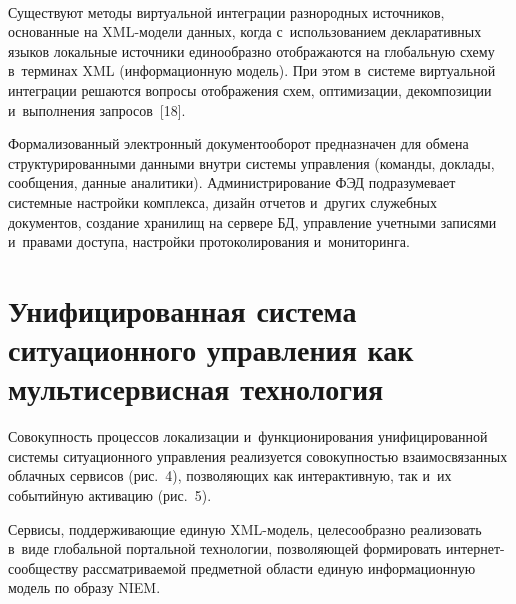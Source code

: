 \begin{multicols}{2}
\begin{enumerate}[1.]
\begin{figure*}[b] %
 \begin{center}
 \mbox{%
 \epsfxsize=134.972mm 
 }
 \end{center}
\vspace*{-9pt}
\end{figure*}
    
    Существуют методы виртуальной интеграции разнородных источников, 
основанные на XML-мо\-де\-ли данных, когда с~использованием 
декларативных языков локальные источники единообразно отоб\-ра\-жа\-ют\-ся на 
глобальную схему в~терминах XML (информационную модель). При этом 
в~сис\-те\-ме виртуальной интеграции решаются вопросы отображения схем, 
оптимизации, декомпозиции и~выполнения запросов~[18]. 
    
    Формализованный электронный документооборот предназначен для 
обмена структурированными данными внутри сис\-те\-мы управ\-ле\-ния 
(команды, доклады, сообщения, данные аналитики). Администрирование 
ФЭД подразумевает сис\-тем\-ные настройки комплекса, дизайн отчетов 
и~других служебных документов, со\-зда\-ние хранилищ на сервере БД, 
управ\-ле\-ние учетными записями и~правами доступа, настройки 
протоколирования и~мониторинга.
\end{enumerate}


\vspace*{-6pt}

\section{Унифицированная система ситуационного управления как 
мультисервисная технология}
    
    Совокупность процессов локализации и~функционирования 
унифицированной сис\-те\-мы ситуационного управ\-ле\-ния реа\-ли\-зу\-ет\-ся 
со\-во\-куп\-ностью взаимосвязанных облачных сервисов (рис.~4), 
поз\-во\-ля\-ющих как интерактивную, так и~их событийную активацию (рис.~5).


    
    Сервисы, поддерживающие единую XML-мо\-дель, целесообразно 
реализовать в~виде глобальной портальной технологии, поз\-во\-ля\-ющей 
формировать ин\-тер\-нет-со\-об\-щест\-ву рас\-смат\-ри\-ва\-емой пред\-мет\-ной 
об\-ласти единую информационную модель по образу NIEM.
    


\end{multicols}
